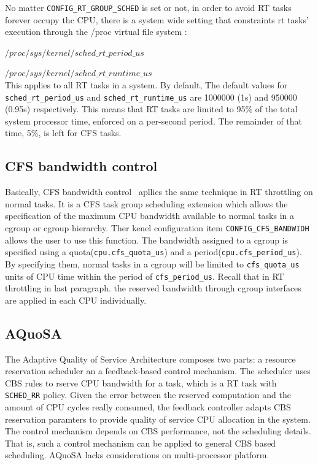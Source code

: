 No matter \texttt{CONFIG\_RT\_GROUP\_SCHED} is set or not, in order to avoid RT 
tasks forever occupy thc CPU, there is a system wide setting that constraints
rt tasks' execution through the /proc virtual file system :

	$/proc/sys/kernel/sched\_rt\_period\_us$ 

	$/proc/sys/kernel/sched\_rt\_runtime\_us$ 
\\This applies to all RT tasks in a system. By default, 
The default values for \texttt{sched\_rt\_period\_us} and
\texttt{sched\_rt\_runtime\_us} are 1000000 (1s) and 950000 (0.95s)
respectively. This means that RT tasks are limited to 95\% of the total
system processor time, enforced on a per-second period. The remainder 
of that time, 5\%, is left for CFS tasks. 

\subsection{CFS bandwidth control\label{sec:RelatedWork_CFS}}

Basically, CFS bandwidth control~\cite{cfs-bwc} apllies the same technique 
in RT throttling on normal tasks. It is a CFS task group scheduling 
extension which allows the specification of the maximum CPU bandwidth
available to normal tasks in a cgroup or cgroup hierarchy. Ther kenel
configuration item \texttt{CONFIG\_CFS\_BANDWIDH} allows the user to use
this function. The bandwidth assigned to a cgroup is specified using a 
quota(\texttt{cpu.cfs\_quota\_us}) and a period(\texttt{cpu.cfs\_period\_us}).
By specifying them, normal tasks in a cgroup will be limited to 
\texttt{cfs\_quota\_us} units of CPU time within the period of 
\texttt{cfs\_period\_us}. Recall that in RT throttling in last paragraph.
the reserved bandwidth through cgroup interfaces are applied in each CPU
individually.

\subsection{AQuoSA\label{sec:RelatedWork_AQuoSA}}

The Adaptive Quality of Service Architecture composes two parts: 
a resource reservation scheduler an a feedback-based
control mechanism. The scheduler uses CBS rules to rserve CPU bandwidth for
a task, which is a RT task with \texttt{SCHED\_RR} policy.
Given the error between the reserved computation and the amount of CPU cycles
really consumed, the feedback controller adapts CBS reservation paramters to
provide quality of service CPU allocation in the system.
The control mechanism depends on CBS performance, not the scheduling details.
That is, such a control mechanism can be applied to general CBS based 
scheduling. AQuoSA lacks considerations on multi-processor platform.
  
